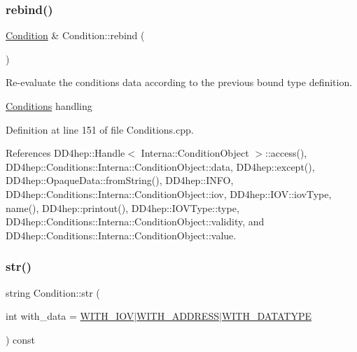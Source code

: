 \hypertarget{class_d_d4hep_1_1_conditions_1_1_condition_affc3f86e2c713e2122dabc3372d460f0}{}\label{class_d_d4hep_1_1_conditions_1_1_condition_affc3f86e2c713e2122dabc3372d460f0} 
\subsubsection{\texorpdfstring{rebind()}{rebind()}}
{\footnotesize\ttfamily \hyperlink{class_d_d4hep_1_1_conditions_1_1_condition}{Condition} \& Condition\+::rebind (\begin{DoxyParamCaption}{ }\end{DoxyParamCaption})}



Re-\/evaluate the conditions data according to the previous bound type definition. 

\hyperlink{namespace_d_d4hep_1_1_conditions}{Conditions} handling 

Definition at line 151 of file Conditions.\+cpp.



References D\+D4hep\+::\+Handle$<$ Interna\+::\+Condition\+Object $>$\+::access(), D\+D4hep\+::\+Conditions\+::\+Interna\+::\+Condition\+Object\+::data, D\+D4hep\+::except(), D\+D4hep\+::\+Opaque\+Data\+::from\+String(), D\+D4hep\+::\+I\+N\+FO, D\+D4hep\+::\+Conditions\+::\+Interna\+::\+Condition\+Object\+::iov, D\+D4hep\+::\+I\+O\+V\+::iov\+Type, name(), D\+D4hep\+::printout(), D\+D4hep\+::\+I\+O\+V\+Type\+::type, D\+D4hep\+::\+Conditions\+::\+Interna\+::\+Condition\+Object\+::validity, and D\+D4hep\+::\+Conditions\+::\+Interna\+::\+Condition\+Object\+::value.

\hypertarget{class_d_d4hep_1_1_conditions_1_1_condition_a52e16cc74af6243e39b6c55e6ae27c84}{}\label{class_d_d4hep_1_1_conditions_1_1_condition_a52e16cc74af6243e39b6c55e6ae27c84} 
\subsubsection{\texorpdfstring{str()}{str()}}
{\footnotesize\ttfamily string Condition\+::str (\begin{DoxyParamCaption}\item[{int}]{with\+\_\+data = {\ttfamily \hyperlink{class_d_d4hep_1_1_conditions_1_1_condition_a6d54644b9e4e9d550a10707e72e5b298a407e2b00d51258e13d82e8632f62746b}{W\+I\+T\+H\+\_\+\+I\+OV}$\vert$\hyperlink{class_d_d4hep_1_1_conditions_1_1_condition_a6d54644b9e4e9d550a10707e72e5b298a4a0769943c197cfba347ebc1397a2ee7}{W\+I\+T\+H\+\_\+\+A\+D\+D\+R\+E\+SS}$\vert$\hyperlink{class_d_d4hep_1_1_conditions_1_1_condition_a6d54644b9e4e9d550a10707e72e5b298a1f2afb3299a66acc0b45e2e098053253}{W\+I\+T\+H\+\_\+\+D\+A\+T\+A\+T\+Y\+PE}} }\end{DoxyParamCaption}) const}




